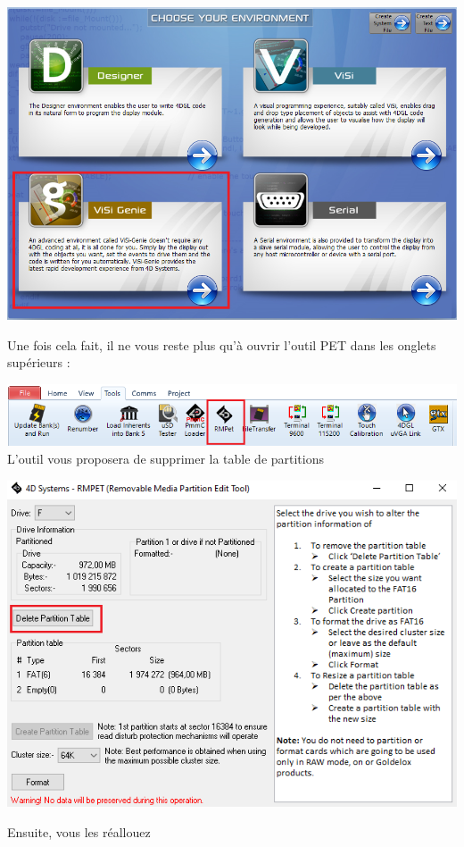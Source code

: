\documentclass[11pt]{article}
\begin{document}
\includegraphics[width=\textwidth]{Format4.png}

\newpage
Une fois cela fait, il ne vous reste plus qu'à ouvrir l'outil PET dans les onglets supérieurs :

\includegraphics[width=\textwidth]{Format5.png}
\\

L'outil vous proposera de supprimer la table de partitions

\includegraphics[width=\textwidth]{Format6.png}

Ensuite, vous les réallouez 
\end{document}
